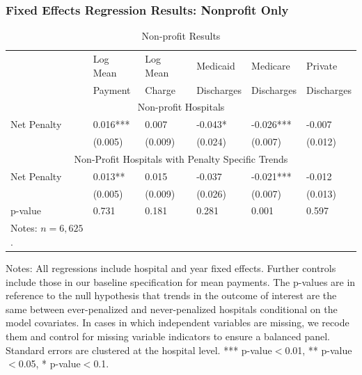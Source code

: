 \documentclass[ucs,9pt]{beamer}
\begin{document}
\begin{frame}
\frametitle{Fixed Effects Regression Results: Nonprofit Only}
\begin{table}[htp]
\centering \normalsize
\caption{Non-profit Results}
\footnotesize
\begin{tabular}{llllll}
\hline	
\hline
 			& Log Mean				& Log Mean				& Medicaid 	   	& Medicare   		& Private  			\\
			& Payment		& Charge			& Discharges      		& Discharges       	& Discharges    \\
	\hline
\multicolumn{6}{c}{Non-profit Hospitals}\\											
\hline											
Net Penalty 	&	0.016***	&	0.007	&	-0.043*	&	-0.026***	&	-0.007	\\
	&	(0.005)	&	(0.009)	&	(0.024)	&	(0.007)	&	(0.012)	\\
\hline											
\multicolumn{6}{c}{Non-Profit Hospitals with Penalty Specific Trends} 											\\
						\hline					
Net Penalty 	&	0.013**	&	0.015	&	-0.037	&	-0.021***	&	-0.012	\\
	&	(0.005)	&	(0.009)	&	(0.026)	&	(0.007)	&	(0.013)	\\
p-value & 0.731 & 0.181 & 0.281 & 0.001 & 0.597 \\
\hline
\tiny Notes: $n=6,625$.  
\end{tabular}
\end{table}
\tiny Notes: All regressions include hospital and year fixed effects.  Further controls include those in our baseline specification for mean payments.  The p-values are in reference to the null hypothesis that trends in the outcome of interest are the same between ever-penalized and never-penalized hospitals conditional on the model covariates.  In cases in which independent variables are missing, we recode them and control for missing variable indicators to ensure a balanced panel.  Standard errors are clustered at the hospital level.  *** p-value$<$0.01, ** p-value$<$0.05, * p-value$<$0.1.
\end{frame}
\end{document}
